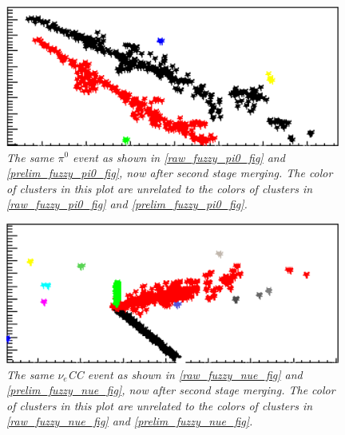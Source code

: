 \documentclass{article}
\begin{document}
\begin{figure}[h!]
\begin{center}
\includegraphics[width=110mm]{Figures/second_fuzzy_pi0.png}
\end{center}
\caption{\textit{The same $\pi^0$ event as shown in \autoref{raw_fuzzy_pi0_fig} and \autoref{prelim_fuzzy_pi0_fig}, now after second stage merging. The color of clusters in this plot are unrelated to the colors of clusters in \autoref{raw_fuzzy_pi0_fig} and \autoref{prelim_fuzzy_pi0_fig}.}}
\label{second_fuzzy_pi0_fig}
\end{figure}

\begin{figure}[h!]
\begin{center}
\includegraphics[width=110mm]{Figures/second_fuzzy_nue.png}
\end{center}
\caption{\textit{The same $\nu_e$CC event as shown in \autoref{raw_fuzzy_nue_fig} and \autoref{prelim_fuzzy_nue_fig}, now after second stage merging. The color of clusters in this plot are unrelated to the colors of clusters in \autoref{raw_fuzzy_nue_fig} and \autoref{prelim_fuzzy_nue_fig}.}}
\label{second_fuzzy_nue_fig}
\end{figure}

\end{document}

